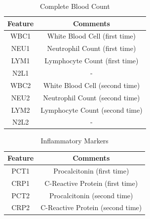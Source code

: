 \begin{table}[H]
\centering
\begin{tabular}{@{}cc@{}}
\toprule
Feature                   & Comments \\ 
\toprule
WBC1 &	White Blood Cell (first time) \\
NEU1 &	Neutrophil Count (first time) \\
LYM1 &	Lymphocyte Count (first time) \\
N2L1 &  -  \\
WBC2 &	White Blood Cell (second time)  \\
NEU2 &	Neutrophil Count (second time) \\
LYM2 &	Lymphocyte Count (second time) \\
N2L2 &  -  \\
\bottomrule
\end{tabular}
\caption{Complete Blood Count}
\end{table}


\begin{table}[H]
\centering
\begin{tabular}{@{}cc@{}}
\toprule
Feature                   & Comments  \\ 
\toprule
PCT1 &	Procalcitonin (first time)  \\
CRP1 &	C-Reactive Protein (first time)  \\
PCT2 &	Procalcitonin (second time)  \\
CRP2 &	C-Reactive Protein (second time) \\
\bottomrule
\end{tabular}
\caption{Inflammatory Markers}
\end{table}

